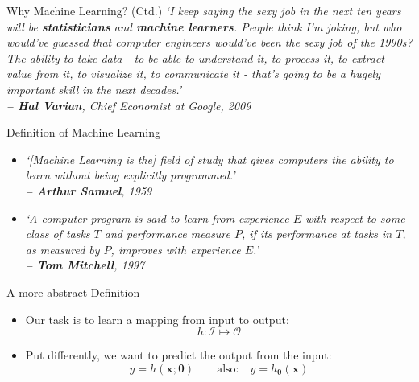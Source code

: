 \begin{frame}{Why Machine Learning? (Ctd.)}{}
	\textit{`I keep saying the sexy job in the next ten years will be \textbf{statisticians} and \textbf{machine learners}.
		People think I’m joking, but who would’ve guessed that computer engineers would’ve been the sexy job of the
		1990s? The ability to take data - to be able to understand it, to process it, to extract value from it, to visualize it,
		to communicate it - that’s going to be a hugely important skill in the next decades.' \\
		\hfill\textbf{-- Hal Varian}, Chief Economist at Google, 2009}
\end{frame}


\begin{frame}{Definition of Machine Learning}{}
	\begin{itemize}
		\item \textit{`[Machine Learning is the] field of study that gives computers the ability
			to learn without being explicitly programmed.' \\
			\hfill\textbf{-- Arthur Samuel}, 1959}
		\vspace*{5mm}
		\item \textit{`A computer program is said to learn from experience $E$ with respect to some class of 
			tasks $T$ and performance measure $P$, if its performance at tasks in $T$, as measured by $P$, improves with
			experience $E$.' \\
			\hfill\textbf{-- Tom Mitchell}, 1997}
	\end{itemize}
\end{frame}


\begin{frame}{A more abstract Definition}{}\important
	\begin{itemize}
		\item Our task is to learn a mapping from input to output:
		\begin{equation*}
			h : \mathcal{I} \mapsto \mathcal{O}
		\end{equation*}
		\item Put differently, we want to predict the output from the input:
		\begin{equation*}
			y = h(\bm{x}; \bm{\theta}) \qquad\text{also:}\quad y = h_{\bm{\theta}}(\bm{x})
		\end{equation*}
	\end{itemize}
\end{frame}


